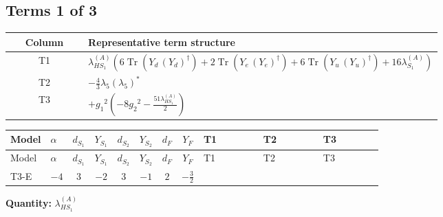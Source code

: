 \documentclass[8pt]{article}
\begin{document}
\begin{landscape}
\subsection*{Terms 1 of 3}
\begin{center}
\begin{tabular}{@{}c >{\raggedright\arraybackslash}p{0.82\linewidth}@{}}
\toprule
Column & Representative term structure \\
\midrule
T1 & \(\displaystyle {\lambda_{HS_1}^{(A)}} (6 \operatorname{Tr}\!\left({Y_d}\,\left({Y_d}\right)^{\dagger}\right)+2 \operatorname{Tr}\!\left({Y_e}\,\left({Y_e}\right)^{\dagger}\right)+6 \operatorname{Tr}\!\left({Y_u}\,\left({Y_u}\right)^{\dagger}\right)+16 {\lambda_{S_1}^{(A)}})\) \\
\midrule
T2 & \(\displaystyle -\frac{4}{3} {\lambda_5} \left({\lambda_5}\right)^{*}\) \\
\midrule
T3 & \(\displaystyle +{g_1}^2 \left(-8 {g_2}^2-\frac{51 {\lambda_{HS_1}^{(A)}}}{2}\right)\) \\
\midrule
\bottomrule
\end{tabular}
\end{center}
\smallskip
\tiny
\begin{longtable}{@{}llcccccc >{\raggedright\arraybackslash}p{0.21\linewidth} >{\raggedright\arraybackslash}p{0.21\linewidth} >{\raggedright\arraybackslash}p{0.21\linewidth}@{}}
\toprule
Model & $\alpha$ & $d_{S_1}$ & $Y_{S_1}$ & $d_{S_2}$ & $Y_{S_2}$ & $d_F$ & $Y_F$ & T1 & T2 & T3 \\
\midrule
\endfirsthead
\toprule
Model & $\alpha$ & $d_{S_1}$ & $Y_{S_1}$ & $d_{S_2}$ & $Y_{S_2}$ & $d_F$ & $Y_F$ & T1 & T2 & T3 \\
\midrule
\endhead
T3-E & $-4$ & $3$ & $-2$ & $3$ & $-1$ & $2$ & $-\frac{3}{2}$ & \scriptsize\adjustbox{max width=\linewidth}{$\begin{gathered} {\lambda_{HS_1}^{(A)}} (6 \operatorname{Tr}\!\left({Y_d}\,\left({Y_d}\right)^{\dagger}\right)+2 \operatorname{Tr}\!\left({Y_e}\,\left({Y_e}\right)^{\dagger}\right)+6 \operatorname{Tr}\!\left({Y_u}\,\left({Y_u}\right)^{\dagger}\right)+16 {\lambda_{S_1}^{(A)}})\end{gathered}$} & \scriptsize\adjustbox{max width=\linewidth}{$\begin{gathered} -\frac{4}{3} {\lambda_5} \left({\lambda_5}\right)^{*}\end{gathered}$} & \scriptsize\adjustbox{max width=\linewidth}{$\begin{gathered} +{g_1}^2 \left(-8 {g_2}^2-\frac{51 {\lambda_{HS_1}^{(A)}}}{2}\right)\end{gathered}$} \\
\midrule
\bottomrule
\end{longtable}
\clearpage
\noindent\textbf{Quantity: }$\lambda_{HS_1}^{(A)}$\par\smallskip

\end{landscape}
\end{document}

